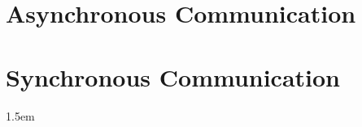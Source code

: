 \documentclass[11pt]{article}
\begin{document}
\section{Asynchronous Communication} \label{sec:async}


\section{Synchronous Communication} \label{sec:sync}


%
%
%

%	

%	
%
%	
%
%	
%
%
%	
%
%	
%
%
%	
%
%	





\emergencystretch 1.5em

\end{document}
